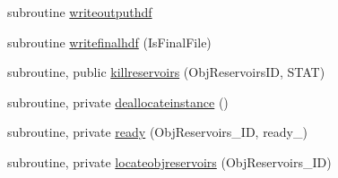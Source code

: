 \begin{DoxyCompactItemize}
\item 
subroutine \mbox{\hyperlink{namespacemodulereservoirs_acfc5816f94fa9d8f10e180691ee50039}{writeoutputhdf}}
\item 
subroutine \mbox{\hyperlink{namespacemodulereservoirs_ab10c15bc98d09e4f38187f218fce8925}{writefinalhdf}} (Is\+Final\+File)
\item 
subroutine, public \mbox{\hyperlink{namespacemodulereservoirs_a7b14b20d3da20267f728eae98a202e5e}{killreservoirs}} (Obj\+Reservoirs\+ID, S\+T\+AT)
\item 
subroutine, private \mbox{\hyperlink{namespacemodulereservoirs_a8f177c238d3cfcadea634aef11e22772}{deallocateinstance}} ()
\item 
subroutine, private \mbox{\hyperlink{namespacemodulereservoirs_a5aff53aba3466a0410c29761e37a55a5}{ready}} (Obj\+Reservoirs\+\_\+\+ID, ready\+\_\+)
\item 
subroutine, private \mbox{\hyperlink{namespacemodulereservoirs_a777d3a0c23fa5c2ea11ed589e1d23711}{locateobjreservoirs}} (Obj\+Reservoirs\+\_\+\+ID)
\end{DoxyCompactItemize}
